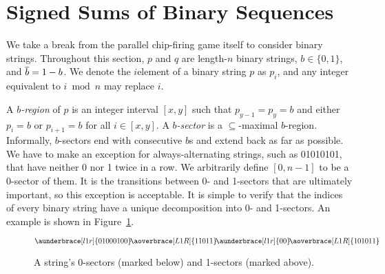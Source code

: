 \section{Signed Sums of Binary Sequences}\label{binSeq}
We take a break from the parallel chip-firing game itself to consider binary
strings. Throughout this section, $p$ and $q$ are length-$n$ binary strings, $b
\in \{0,1\}$, and $\overline{b} = 1-b$. We denote the $i$\xth element of a binary
string $p$ as $p_i$, and any integer equivalent to $i \bmod n$ may replace $i$.

A \emph{$b$-region} of $p$ is an integer interval $[x,y]$ such that $p_{y-1} =
p_y = b$ and either $p_i = b$ or $p_{i+1} = b$ for all $i \in [x,y]$. A
\emph{$b$-sector} is a $\subseteq$-maximal $b$-region. Informally, $b$-sectors
end with consecutive $b$s and extend back as far as possible. We have to make
an exception for always-alternating strings, such as 01010101, that have
neither 0 nor 1 twice in a row. We arbitrarily define $[0, n-1]$ to be a
0-sector of them. It is the transitions between 0- and 1-sectors that are
ultimately important, so this exception is acceptable. It is simple to verify
that the indices of every binary string have a unique decomposition into 0- and
1-sectors. An example is shown in Figure~\ref{sectorEx}.

\begin{figure}
  \[
    \aunderbrace[l1r]{01000100}
    \!\aoverbrace[L1R]{11011}
    \!\aunderbrace[l1r]{00}
    \!\aoverbrace[L1R]{101011}
  \]
  \caption{A string's 0-sectors (marked below) and 1-sectors (marked
    above).}
  \label{sectorEx}
\end{figure}

